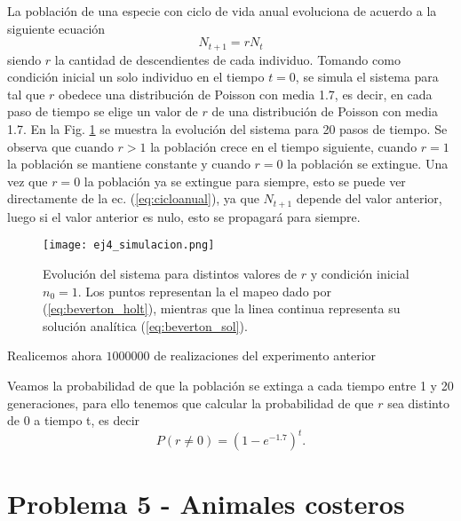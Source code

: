 \documentclass[letterpaper,12pt]{article}
\theoremstyle{plain}
\begin{document}
La población de una especie con ciclo de vida anual evoluciona de acuerdo a la siguiente ecuación 
\begin{equation}
    N_{t+1} = r N_t
    \label{eq:cicloanual}
\end{equation}    
siendo $r$ la cantidad de descendientes de cada individuo. Tomando como condición inicial un solo individuo en el tiempo $t=0$, se simula el sistema para tal que $r$ obedece una distribución de Poisson con media 1.7, es decir, en cada paso de tiempo se elige un valor de $r$ de una distribución de Poisson con media 1.7. En la Fig. \ref*{fig:ej4_simulacion} se muestra la evolución del sistema para 20 pasos de tiempo. Se observa que cuando $r>1$ la población crece en el tiempo siguiente, cuando $r=1$ la población se mantiene constante y cuando $r=0$ la población se extingue. Una vez que $r=0$ la población ya se extingue para siempre, esto se puede ver directamente de la ec. (\ref*{eq:cicloanual}), ya que $N_{t+1}$ depende del valor anterior, luego si el valor anterior es nulo, esto se propagará para siempre.

\begin{figure}[h]
    \centering
    \texttt{[image: ej4\_simulacion.png]}
    \caption{Evolución del sistema para distintos valores de $r$ y condición inicial $n_0=1$. Los puntos representan la el mapeo dado por (\ref*{eq:beverton_holt}), mientras que la linea continua representa su solución analítica (\ref*{eq:beverton_sol}).} 
    \label{fig:ej4_simulacion}
\end{figure}

Realicemos ahora $1000000$ de realizaciones del experimento anterior

Veamos la probabilidad de que la población se extinga a cada tiempo entre 1 y 20 generaciones, para ello tenemos que calcular la probabilidad de que $r$ sea distinto de 0 a tiempo t, es decir 
\begin{equation}
    P(r \ne 0) = (1 - e^{-1.7})^t.
\end{equation}

\section{Problema 5 - Animales costeros}
\end{document}

